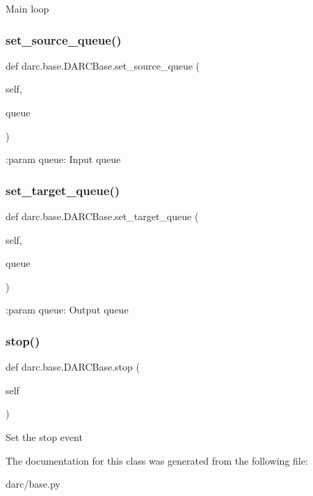 \begin{DoxyVerb}Main loop
\end{DoxyVerb}
 \mbox{\label{classdarc_1_1base_1_1_d_a_r_c_base_adcf13fe8e114a4c31a9134142426e2d9}} 
\subsubsection{\texorpdfstring{set\_source\_queue()}{set\_source\_queue()}}
{\footnotesize\ttfamily def darc.\+base.\+D\+A\+R\+C\+Base.\+set\+\_\+source\+\_\+queue (\begin{DoxyParamCaption}\item[{}]{self,  }\item[{}]{queue }\end{DoxyParamCaption})}

\begin{DoxyVerb}:param queue: Input queue
\end{DoxyVerb}
 \mbox{\label{classdarc_1_1base_1_1_d_a_r_c_base_aeaef9ad54544adfbed40e4aae7254b66}} 
\subsubsection{\texorpdfstring{set\_target\_queue()}{set\_target\_queue()}}
{\footnotesize\ttfamily def darc.\+base.\+D\+A\+R\+C\+Base.\+set\+\_\+target\+\_\+queue (\begin{DoxyParamCaption}\item[{}]{self,  }\item[{}]{queue }\end{DoxyParamCaption})}

\begin{DoxyVerb}:param queue: Output queue
\end{DoxyVerb}
 \mbox{\label{classdarc_1_1base_1_1_d_a_r_c_base_ab798d069a7ae53fa039a55df6242958c}} 
\subsubsection{\texorpdfstring{stop()}{stop()}}
{\footnotesize\ttfamily def darc.\+base.\+D\+A\+R\+C\+Base.\+stop (\begin{DoxyParamCaption}\item[{}]{self }\end{DoxyParamCaption})}

\begin{DoxyVerb}Set the stop event
\end{DoxyVerb}
 

The documentation for this class was generated from the following file\+:\begin{DoxyCompactItemize}
\item 
darc/base.\+py\end{DoxyCompactItemize}
